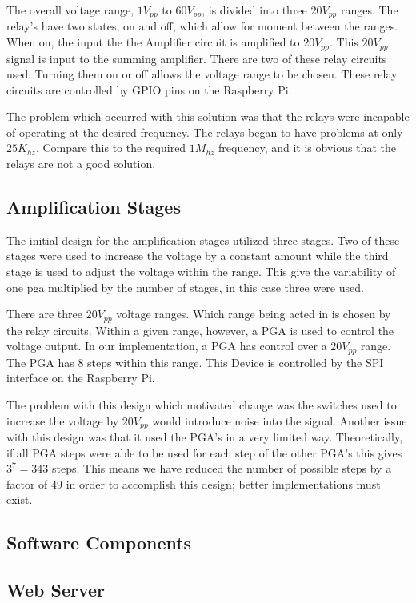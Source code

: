 \documentclass{article}	%
\begin{document}
\begin{multicols}{2}
The overall voltage range,
$1V_{pp}$ to $60V_{pp}$,
is divided into three $20V_{pp}$ ranges.
The relay's have two states,
on and off,
which allow for moment between the ranges.
When on,
the input the the Amplifier circuit is amplified to $20V_{pp}$.
This $20V_{pp}$ signal is input to the summing amplifier.
There are two of these relay circuits used.
Turning them on or off allows the voltage range to be chosen.
These relay circuits are controlled by 
GPIO pins on the Raspberry Pi.

The problem which occurred with this solution
was that the relays were incapable of
operating at the desired frequency.
The relays began to have problems at only $25K_{hz}$.
Compare this to the required $1M_{hz}$ frequency, and
it is obvious that the relays are not a good solution.

\subsection{Amplification Stages}
The initial design for the amplification stages
utilized three stages.
Two of these stages were used to increase the voltage by a constant amount while
the third stage is used to adjust the voltage within the range.
This give the variability of one pga multiplied by the number of stages,
in this case three were used.

There are three $20V_{pp}$ voltage ranges.
Which range being acted in is chosen by the relay circuits.
Within a given range,
however,
a PGA is used to control the voltage output.
In our implementation,
a PGA has control over a $20V_{pp}$ range.
The PGA has 8 steps within this range.
This Device is controlled by 
the SPI interface on the Raspberry Pi.

The problem with this design which motivated change was
the switches used to increase the voltage
by $20V_{pp}$ would introduce noise into the signal.
Another issue with this design was that
it used the PGA's in a very limited way.
Theoretically, if all PGA steps were able to
be used for each step of the other PGA's
this gives $3^7 = 343$ steps.
This means we have reduced the number of possible
steps by a factor of $49$ in order to accomplish
this design; better implementations must exist.


\subsection{Software Components}
\subsection{Web Server}


\end{multicols}
\end{document}
